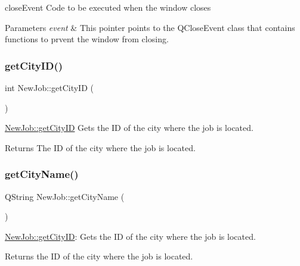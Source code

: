 close\+Event Code to be executed when the window closes 


\begin{DoxyParams}{Parameters}
{\em event} & This pointer points to the Q\+Close\+Event class that contains functions to prvent the window from closing. \\
\hline
\end{DoxyParams}
\mbox{\label{class_new_job_aed4a9a6fa7eab69062c1d36afd58cd75}} 
\subsubsection{\texorpdfstring{get\+City\+I\+D()}{getCityID()}}
{\footnotesize\ttfamily int New\+Job\+::get\+City\+ID (\begin{DoxyParamCaption}{ }\end{DoxyParamCaption})}



\mbox{\hyperlink{class_new_job_aed4a9a6fa7eab69062c1d36afd58cd75}{New\+Job\+::get\+City\+ID}} Gets the ID of the city where the job is located. 

\begin{DoxyReturn}{Returns}
The ID of the city where the job is located. 
\end{DoxyReturn}
\mbox{\label{class_new_job_a0b1679fdb58a6c4d72d935595ba4e835}} 
\subsubsection{\texorpdfstring{get\+City\+Name()}{getCityName()}}
{\footnotesize\ttfamily Q\+String New\+Job\+::get\+City\+Name (\begin{DoxyParamCaption}{ }\end{DoxyParamCaption})}



\mbox{\hyperlink{class_new_job_aed4a9a6fa7eab69062c1d36afd58cd75}{New\+Job\+::get\+City\+ID}}\+: Gets the ID of the city where the job is located. 

\begin{DoxyReturn}{Returns}
the ID of the city where the job is located. 
\end{DoxyReturn}
\mbox{\label{class_new_job_ad4680ae9c009b90ce751c3c5fe60cdb5}} 
